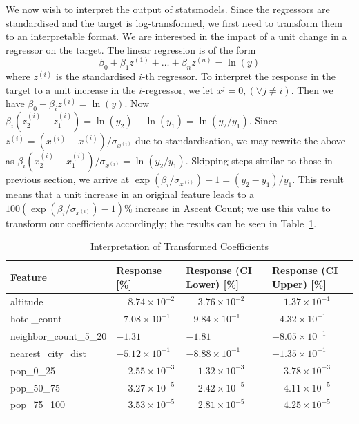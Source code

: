 \documentclass[11pt,a4paper]{article}
\begin{document}
We now wish to interpret the output of statsmodels. Since the regressors are standardised and the target is log-transformed, we first need to transform them to an interpretable format. We are interested in the impact of a unit change in a regressor on the target. The linear regression is of the form 
$$\beta_0+\beta_1z^{(1)}+ \dots + \beta_n z^{(n)}=\ln(y)$$ 
where $z^{(i)}$ is the standardised $i$-th regressor. To interpret the response in the target to a unit increase in the $i$-regressor, we let $x^j = 0, (\forall j \neq i)$. Then we have $\beta_0 + \beta_i z^{(i)} = \ln(y)$. Now $\beta_i (z_2^{(i)} - z_1^{(i)}) = \ln(y_2) - \ln(y_1)=\ln(y_2/y_1)$. Since 
$z^{(i)} = (x^{(i)} - \overline{x}^{(i)})/\sigma_{x^{(i)}}$
due to standardisation, we may rewrite the above as $\beta_i (x_2^{(i)} - x_1^{(i)})/\sigma_{x^{(i)}} =\ln(y_2/y_1)$. Skipping steps similar to those in previous section, we arrive at $\exp(\beta_i / \sigma_{x^{(i)}}) - 1 = (y_2 - y_1) / y_1$. This result means that a unit increase in an original feature leads to a $100\left(\exp(\beta_i / \sigma_{x^{(i)}}) - 1\right)\%$ increase in Ascent Count; we use this value to transform our coefficients accordingly; the results can be seen in Table~\ref{table:2}.
\begin{table} [h!]
\centering
\caption{Interpretation of Transformed Coefficients}
\begin{tabular}{l l l l}
\toprule
    Feature & 
    Response [\%] & 
    Response (CI Lower) [\%] & 
    Response (CI Upper) [\%] \\
\midrule
altitude & $\phantom{-}8.74 \times 10^{-2}$ & $\phantom{-}3.76\times 10^{-2}$ & $\phantom{-}1.37\times 10^{-1}$ \\
hotel\_count & $-7.08\times 10^{-1}$ & $-9.84\times 10^{-1}$ & $-4.32\times 10^{-1}$ \\
neighbor\_count\_5\_20 & $-1.31$ & $-1.81$ & $-8.05\times 10^{-1}$ \\
nearest\_city\_dist & $-5.12\times 10^{-1}$ & $-8.88\times 10^{-1}$ & $-1.35\times 10^{-1}$ \\
pop\_0\_25 & $\phantom{-}2.55 \times 10^{-3}$ & $\phantom{-}1.32\times 10^{-3}$ & $\phantom{-}3.78\times 10^{-3}$ \\
pop\_50\_75 & $\phantom{-}3.27 \times 10^{-5}$ & $\phantom{-}2.42\times 10^{-5}$ &  $\phantom{-}4.11\times 10^{-5}$ \\
pop\_75\_100 & $\phantom{-}3.53 \times 10^{-5}$ & $\phantom{-}2.81\times 10^{-5}$ &  $\phantom{-}4.25\times 10^{-5}$\\
\bottomrule
\label{table:2}
\end{tabular}
\end{table}
\end{document}
